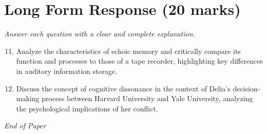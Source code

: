 \documentclass[12pt]{article}
\begin{document}
\section*{Long Form Response (20 marks)}
\textit{Answer each question with a clear and complete explanation.}
\begin{enumerate}[label=\arabic*.]
\setcounter{enumi}{10}
\item Analyze the characteristics of echoic memory and critically compare its function and processes to those of a tape recorder, highlighting key differences in auditory information storage.
\item Discuss the concept of cognitive dissonance in the context of Delia's decision-making process between Harvard University and Yale University, analyzing the psychological implications of her conflict.
\end{enumerate}

\vfill
\noindent\textit{End of Paper}
\end{document}
